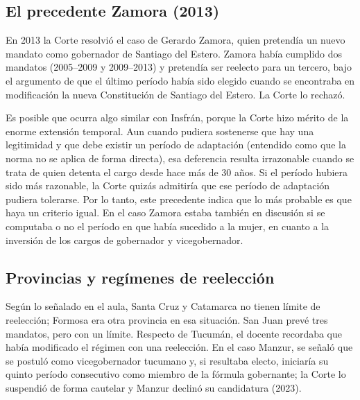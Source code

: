 \documentclass[12pt,oneside]{book}
\begin{document}
\subsection{El precedente Zamora (2013)}

En 2013 la Corte resolvió el caso de Gerardo Zamora, quien pretendía un nuevo mandato como gobernador de Santiago del Estero. Zamora había cumplido dos mandatos (2005--2009 y 2009--2013) y pretendía ser reelecto para un tercero, bajo el argumento de que el último período había sido elegido cuando se encontraba en modificación la nueva Constitución de Santiago del Estero. La Corte lo rechazó.

Es posible que ocurra algo similar con Insfrán, porque la Corte hizo mérito de la enorme extensión temporal. Aun cuando pudiera sostenerse que hay una legitimidad y que debe existir un período de adaptación (entendido como que la norma no se aplica de forma directa), esa deferencia resulta irrazonable cuando se trata de quien detenta el cargo desde hace más de 30 años. Si el período hubiera sido más razonable, la Corte quizás admitiría que ese período de adaptación pudiera tolerarse. Por lo tanto, este precedente indica que lo más probable es que haya un criterio igual. En el caso Zamora estaba también en discusión si se computaba o no el período en que había sucedido a la mujer, en cuanto a la inversión de los cargos de gobernador y vicegobernador.

\subsection{Provincias y regímenes de reelección}

Según lo señalado en el aula, Santa Cruz y Catamarca no tienen límite de reelección; Formosa era otra provincia en esa situación. San Juan prevé tres mandatos, pero con un límite. Respecto de Tucumán, el docente recordaba que había modificado el régimen con una reelección. En el caso Manzur, se señaló que se postuló como vicegobernador tucumano y, si resultaba electo, iniciaría su quinto período consecutivo como miembro de la fórmula gobernante; la Corte lo suspendió de forma cautelar y Manzur declinó su candidatura (2023).
\end{document}
